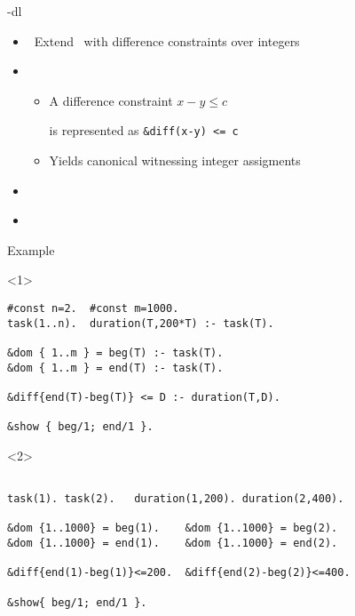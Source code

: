 \begin{frame}{\clingo-dl}
  \begin{itemize}
  \item {} \ Extend \clingo\ with difference constraints over integers
  \item {} \
    \begin{itemize}
    \item A difference constraint
      \(
      {x-y}\leq c
      \)
      \par
      is represented as
      \lstinline[mathescape]{&diff(x-y) <= c}
    \item Yields canonical witnessing integer assigments
    \end{itemize}
  \item {}   \ \cite{jakaosscscwa17a,karoscwa21a}
  \item \structure{Applications} \ \cite{abjoossctowa21a,hamunescwa23a,rascwachliso23a}
  \end{itemize}
\end{frame}
\begin{frame}[fragile]{Example}
  \begin{onlyenv}<1>
\begin{lstlisting}[language=clingo,basicstyle=\small\ttfamily]
#const n=2.  #const m=1000.
task(1..n).  duration(T,200*T) :- task(T).

&dom { 1..m } = beg(T) :- task(T).
&dom { 1..m } = end(T) :- task(T).

&diff{end(T)-beg(T)} <= D :- duration(T,D).

&show { beg/1; end/1 }.
\end{lstlisting}
\end{onlyenv}
\begin{onlyenv}<2>
\begin{lstlisting}[language=clingo,basicstyle=\small\ttfamily]

task(1). task(2).   duration(1,200). duration(2,400).

&dom {1..1000} = beg(1).    &dom {1..1000} = beg(2).
&dom {1..1000} = end(1).    &dom {1..1000} = end(2).

&diff{end(1)-beg(1)}<=200.  &diff{end(2)-beg(2)}<=400.

&show{ beg/1; end/1 }.
\end{lstlisting}
\end{onlyenv}
\end{frame}
%
